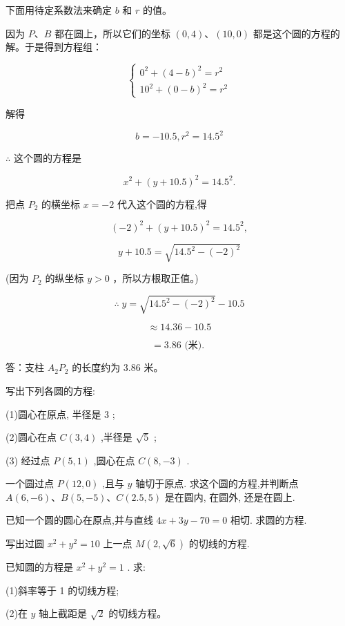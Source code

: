 \documentclass[lang=cn,newtx,12pt,scheme=chinese]{elegantbook}
\begin{document}
下面用待定系数法来确定 \(b\) 和 \(r\) 的值。

因为 \(P\text{、}B\) 都在圆上，所以它们的坐标 \(\left( {0,4}\right) \text{、}\left( {{10},0}\right)\) 都是这个圆的方程的解。于是得到方程组：

\[
  \left\{ \begin{array}{l} {0}^{2} + {\left( 4 - b\right) }^{2} = {r}^{2} \\ {10}^{2} + {\left( 0 - b\right) }^{2} = {r}^{2} \end{array}\right.
\]

解得

\[
  b = - {10.5},{r}^{2} = {14.5}^{2}
\]

\(\therefore\) 这个圆的方程是

\[
    {x}^{2} + {\left( y + {10.5}\right) }^{2} = {14.5}^{2}.
\]

把点 \({P}_{2}\) 的横坐标 \(x = - 2\) 代入这个圆的方程,得

\[
    {\left( -2\right) }^{2} + {\left( y + {10.5}\right) }^{2} = {14.5}^{2},
\]

\[
  y + {10.5} = \sqrt{{14.5}^{2} - {\left( -2\right) }^{2}}
\]

(因为 \({P}_{2}\) 的纵坐标 \(y > 0\) ，所以方根取正值。)

\[
  \therefore \;y = \sqrt{{14.5}^{2} - {\left( -2\right) }^{2}} - {10.5}
\]

\[
  \approx {14.36} - {10.5}
\]

\[
  = {3.86}\text{ (米). }
\]

答：支柱 \({A}_{2}{P}_{2}\) 的长度约为 3.86 米。

\begin{problemset}[练习]

\item 写出下列各圆的方程:

(1)圆心在原点, 半径是 3 ;

(2)圆心在点 \(C\left( {3,4}\right)\) ,半径是 \(\sqrt{5}\) ;

(3) 经过点 \(P\left( {5,1}\right)\) ,圆心在点 \(C\left( {8, - 3}\right)\) .

\item 一个圆过点 \(P\left( {{12},0}\right)\) ,且与 \(y\) 轴切于原点. 求这个圆的方程,并判断点 \(A\left( {6, - 6}\right) \text{、}B\left( {5, - 5}\right) \text{、}C\left( {{2.5},5}\right)\) 是在圆内, 在圆外, 还是在圆上.

\item 已知一个圆的圆心在原点,并与直线 \({4x} + {3y} - {70} = 0\) 相切. 求圆的方程.

\item 写出过圆 \({x}^{2} + {y}^{2} = {10}\) 上一点 \(M\left( {2,\sqrt{6}}\right)\) 的切线的方程.

\item 已知圆的方程是 \({x}^{2} + {y}^{2} = 1\) . 求:

(1)斜率等于 1 的切线方程;

(2)在 \(y\) 轴上截距是 \(\sqrt{2}\) 的切线方程。

\end{problemset}
\end{document}
